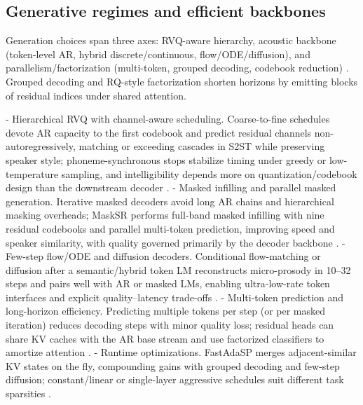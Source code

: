 \documentclass{article}
\begin{document}
\subsection{Generative regimes and efficient backbones} \label{subsec:generativeregimesandefficientbackbones}
Generation choices span three axes: RVQ-aware hierarchy, acoustic backbone (token-level AR, hybrid discrete/continuous, flow/ODE/diffusion), and parallelism/factorization (multi-token, grouped decoding, codebook reduction) \cite{ji2025languagecodecbridgingdiscreterepresentat,verma2024whispergpthybridrepresentationaudiolarge,li2024investigatingneuralaudiocodecsspeechlang,wang2024c3llmconditionalmultimodalcontentgenerat}. Grouped decoding and RQ-style factorization shorten horizons by emitting blocks of residual indices under shared attention.

- Hierarchical RVQ with channel-aware scheduling. Coarse-to-fine schedules devote AR capacity to the first codebook and predict residual channels non-autoregressively, matching or exceeding cascades in S2ST while preserving speaker style; phoneme-synchronous stops stabilize timing under greedy or low-temperature sampling, and intelligibility depends more on quantization/codebook design than the downstream decoder \cite{peng2024mslms2stmultitaskspeechlanguagemodeltext,song2024ellavstableneuralcodeclanguagemodelingal,li2024investigatingneuralaudiocodecsspeechlang}.
- Masked infilling and parallel masked generation. Iterative masked decoders avoid long AR chains and hierarchical masking overheads; MaskSR performs full-band masked infilling with nine residual codebooks and parallel multi-token prediction, improving speed and speaker similarity, with quality governed primarily by the decoder backbone \cite{li2024masksrmaskedlanguagemodelfullbandspeechr,li2024investigatingneuralaudiocodecsspeechlang}.
- Few-step flow/ODE and diffusion decoders. Conditional flow-matching or diffusion after a semantic/hybrid token LM reconstructs micro-prosody in 10--32 steps and pairs well with AR or masked LMs, enabling ultra-low-rate token interfaces and explicit quality--latency trade-offs \cite{wang2025tadicodectextawarediffusionspeechtokeniz,li2024investigatingneuralaudiocodecsspeechlang}.
- Multi-token prediction and long-horizon efficiency. Predicting multiple tokens per step (or per masked iteration) reduces decoding steps with minor quality loss; residual heads can share KV caches with the AR base stream and use factorized classifiers to amortize attention \cite{li2024masksrmaskedlanguagemodelfullbandspeechr}.
- Runtime optimizations. FastAdaSP merges adjacent-similar KV states on the fly, compounding gains with grouped decoding and few-step diffusion; constant/linear or single-layer aggressive schedules suit different task sparsities \cite{lu2024fastadaspmultitaskadaptedefficientinfere}.
\end{document}
